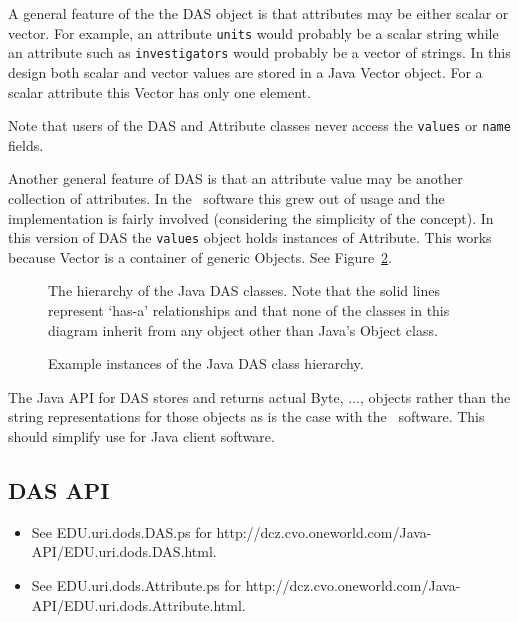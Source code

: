 \documentclass[12pt]{article}
\begin{document}
A general feature of the the DAS object is that attributes may be either
scalar or vector. For example, an attribute {\tt units} would probably be a
scalar string while an attribute such as {\tt investigators} would probably
be a vector of strings. In this design both scalar and vector values are
stored in a Java Vector object. For a scalar attribute this Vector has only
one element.

Note that users of the DAS and Attribute classes never access the {\tt values}
or {\tt name} fields.

Another general feature of DAS is that an attribute value may be another
collection of attributes. In the \Cpp\ software this grew out of usage and
the implementation is fairly involved (considering the simplicity of the
concept). In this version of DAS the {\tt values} object holds instances of
Attribute. This works because Vector is a container of generic Objects. See
Figure~\ref{fig:das:instance}.

\begin{figure}
\centerline{}
\caption{The hierarchy of the Java DAS classes. Note that the solid lines
  represent `has-a' relationships and that none of the classes in this
  diagram inherit from any object other than Java's Object class.}
\label{fig:das:hier}
\end{figure}

\begin{figure}
\centerline{}
\caption{Example instances of the Java DAS class hierarchy.}
\label{fig:das:instance}
\end{figure}

The Java API for DAS stores and returns actual Byte, ..., objects
rather than the string representations for those objects as is the case with
the \Cpp\ software. This should simplify use for Java client software.

\subsection{DAS API}
\label{DAS-API}

\begin{itemize}

\item See EDU.uri.dods.DAS.ps for 
  {http://dcz.cvo.oneworld.com/Java-API/EDU.uri.dods.DAS.html}.

\item See EDU.uri.dods.Attribute.ps for 
  {http://dcz.cvo.oneworld.com/Java-API/EDU.uri.dods.Attribute.html}. 

\end{itemize}
\end{document}
